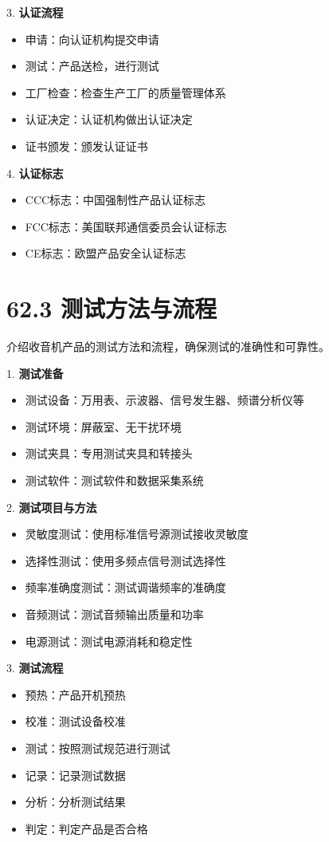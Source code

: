 \documentclass[12pt,UTF8]{ctexbook}
\begin{document}
3. \textbf{认证流程}
   \begin{itemize}[leftmargin=3.5em]
   \item 申请：向认证机构提交申请
   \item 测试：产品送检，进行测试
   \item 工厂检查：检查生产工厂的质量管理体系
   \item 认证决定：认证机构做出认证决定
   \item 证书颁发：颁发认证证书
   \end{itemize}

4. \textbf{认证标志}
   \begin{itemize}[leftmargin=3.5em]
   \item CCC标志：中国强制性产品认证标志
   \item FCC标志：美国联邦通信委员会认证标志
   \item CE标志：欧盟产品安全认证标志
   \end{itemize}

\section*{62.3 测试方法与流程}

介绍收音机产品的测试方法和流程，确保测试的准确性和可靠性。

1. \textbf{测试准备}
   \begin{itemize}[leftmargin=3.5em]
   \item 测试设备：万用表、示波器、信号发生器、频谱分析仪等
   \item 测试环境：屏蔽室、无干扰环境
   \item 测试夹具：专用测试夹具和转接头
   \item 测试软件：测试软件和数据采集系统
   \end{itemize}

2. \textbf{测试项目与方法}
   \begin{itemize}[leftmargin=3.5em]
   \item 灵敏度测试：使用标准信号源测试接收灵敏度
   \item 选择性测试：使用多频点信号测试选择性
   \item 频率准确度测试：测试调谐频率的准确度
   \item 音频测试：测试音频输出质量和功率
   \item 电源测试：测试电源消耗和稳定性
   \end{itemize}

3. \textbf{测试流程}
   \begin{itemize}[leftmargin=3.5em]
   \item 预热：产品开机预热
   \item 校准：测试设备校准
   \item 测试：按照测试规范进行测试
   \item 记录：记录测试数据
   \item 分析：分析测试结果
   \item 判定：判定产品是否合格
   \end{itemize}
\end{document}
